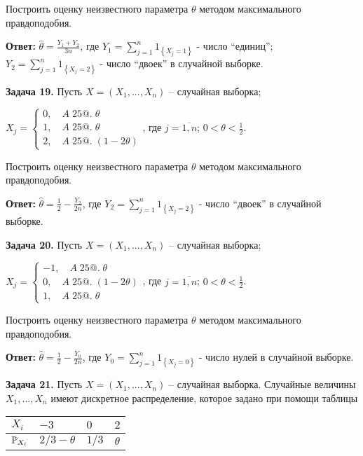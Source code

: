 Построить оценку неизвестного параметра $\theta $ методом максимального правдоподобия.

\textbf{Ответ: }$\widehat{\theta }=\frac{Y_{1} +Y_{2} }{3n} $, где $Y_{1} =\sum _{j=1}^{n}1_{\left\{X_{j} =1\right\}}  $ - число ``единиц''; $Y_{2} =\sum _{j=1}^{n}1_{\left\{X_{j} =2\right\}}  $ - число ``двоек'' в случайной выборке.



\textbf{Задача 19.} Пусть $X=\left(X_{1} ,...,X_{n} \right)$ -- случайная выборка;

$X_{j} =\left\{\begin{array}{l} {0,\quad A\; 25@.\; \theta } \\ {1,\quad A\; 25@.\; \theta } \\ {2,\quad A\; 25@.\; \left(1-2\theta \right)} \end{array}\right. $, где $j=\overline{1,n}$; $0<\theta <{\tfrac{1}{2}} $.

Построить оценку неизвестного параметра $\theta $ методом максимального правдоподобия.

\textbf{Ответ: }$\widehat{\theta }=\frac{1}{2} -\frac{Y_{2} }{2n} $, где $Y_{2} =\sum _{j=1}^{n}1_{\left\{X_{j} =2\right\}}  $ - число ``двоек'' в случайной выборке.





\textbf{Задача 20.} Пусть $X=\left(X_{1} ,...,X_{n} \right)$ -- случайная выборка;

$X_{j} =\left\{\begin{array}{l} {-1,\quad A\; 25@.\; \theta } \\ {0,\quad A\; 25@.\; \left(1-2\theta \right)} \\ {1,\quad A\; 25@.\; \theta } \end{array}\right. $, где $j=\overline{1,n}$; $0<\theta <{\tfrac{1}{2}} $.

Построить оценку неизвестного параметра $\theta $ методом максимального правдоподобия.

\textbf{Ответ: }$\widehat{\theta }=\frac{1}{2} -\frac{Y_{0} }{2n} $, где $Y_{0} =\sum _{j=1}^{n}1_{\left\{X_{j} =0\right\}}  $ - число нулей в случайной выборке.



\textbf{Задача 21.} Пусть $X=\left(X_{1} ,...,X_{n} \right)$ -- случайная выборка. Случайные величины $X_{1} ,...,X_{n} $ имеют дискретное распределение, которое задано при помощи таблицы

\begin{tabular}{|p{0.6in}|p{0.6in}|p{0.6in}|p{0.6in}|} \hline 
$X_{i} $ & $-3$ & $0$ & $2$ \\ \hline 
${\rm {\mathbb P}}_{X_{i} } $ & $2/3-\theta $ & $1/3$ & $\theta $ \\ \hline 
\end{tabular}

